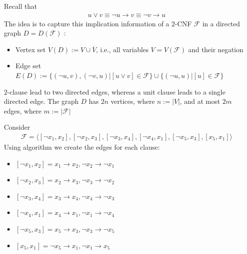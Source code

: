 \documentclass[a4paper]{article}
\theoremstyle{plain}
\theoremstyle{definition}
\newtheorem{defn}{Definition}[section]
\newtheorem{exmp}{Example}[section]
\theoremstyle{remark}
\begin{document}
\begin{tcolorbox}[colback=black!3!white,colframe=black!60!white,title=\begin{defn}Linear-time algorithm for 2 SAT \label{Linear-time algorithm for 2 SAT}\end{defn}]
Recall that 
\begin{align}
u \lor v \equiv \neg u \to v \equiv \neg v \to u
\end{align}
The idea is to capture this implication information of a $2$-CNF $\mathcal{F}$ in a directed graph $D = D (\mathcal{F})$ :
\begin{itemize}
	\item Vertex set $V(D) := V \cup \overline{V}$, i.e., all variables $V = V(\mathcal{F})$ and their negation
	\item Edge set $E(D) := \{(\neg u , v), (\neg v , u) | [ u \lor v] \in \mathcal{F} \} \cup  \{(\neg u , u) | [u] \in \mathcal{F}\}$
\end{itemize}
$2$-clause lead to two directed edges, whereas a unit clause leads to a single directed edge. The graph $D$ has $2n$ vertices, where $n := |V|$, and at most $2m$ edges, where $m := |\mathcal{F}|$
\end{tcolorbox}
\begin{tcolorbox}[colback=black!3!white,colframe=black!60!white,title=\begin{exmp}Linear-time algorithm for 2 SAT \label{Linear-time algorithm for 2 SAT}\end{exmp}]
       Consider
                \begin{align}
               \mathcal{F} = \langle [\neg x_1, x_2],[\neg x_2,x_3],[\neg x_3,x_4],[\neg x_4, x_1] , [\neg x_5, x_3],[x_5, x_1] \rangle
                \end{align}
		Using algorithm we create the edges for each clause:
		\begin{itemize}
			\item $[\neg x_1, x_2] = x_1 \to x_2, \neg x_2 \to \neg x_1$ 
			\item $[\neg x_2, x_3] = x_2 \to x_3, \neg x_3 \to \neg x_2$
			\item $[ \neg x_3, x_4] = x_3 \to x_4, \neg x_4 \to \neg x_3$
			\item $[\neg x_4, x_1] = x_4 \to x_1, \neg x_1 \to \neg x_4$
			\item $[\neg x_5, x_3] = x_5 \to x_3, \neg x_3 \to  \neg x_5$
			\item $[x_5,x_1] = \neg x_5 \to  x_1 , \neg x_1 \to  x_5$
		\end{itemize}
\end{tcolorbox}
\end{document}
